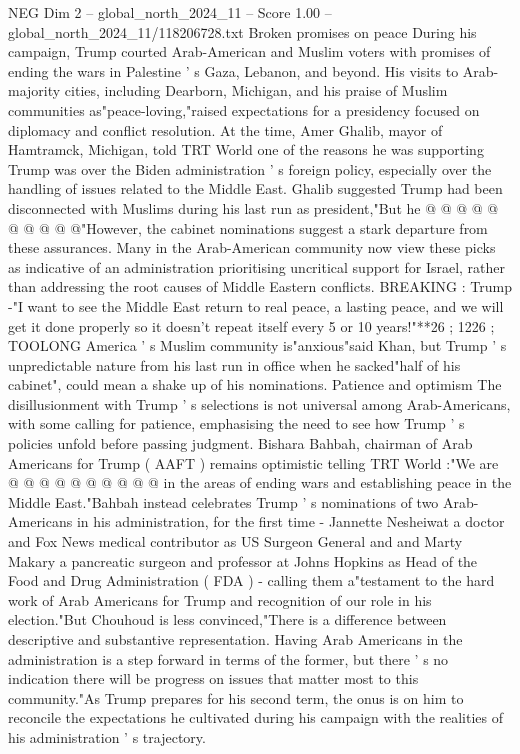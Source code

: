 \begin{textsample}{NEG Dim 2 – global\_north\_2024\_11 – Score 1.00 – global\_north\_2024\_11/118206728.txt}
Broken promises on peace During his campaign, Trump courted Arab-American and Muslim voters with promises of ending the wars in Palestine ' s Gaza, Lebanon, and beyond.
His visits to Arab-majority cities, including Dearborn, Michigan, and his praise of Muslim communities as"peace-loving,"raised expectations for a presidency focused on diplomacy and conflict resolution.
At the time, Amer Ghalib, mayor of Hamtramck, Michigan, told TRT World one of the reasons he was supporting Trump was over the Biden administration ' s foreign policy, especially over the handling of issues related to the Middle East.
Ghalib suggested Trump had been disconnected with Muslims during his last run as president,"But he @ @ @ @ @ @ @ @ @ @"However, the cabinet nominations suggest a stark departure from these assurances.
Many in the Arab-American community now view these picks as indicative of an administration prioritising uncritical support for Israel, rather than addressing the root causes of Middle Eastern conflicts.
BREAKING : Trump -"I want to see the Middle East return to real peace, a lasting peace, and we will get it done properly so it doesn't repeat itself every 5 or 10 years!"**26 ; 1226 ; TOOLONG America ' s Muslim community is"anxious"said Khan, but Trump ' s unpredictable nature from his last run in office when he sacked"half of his cabinet", could mean a shake up of his nominations.
Patience and optimism The disillusionment with Trump ' s selections is not universal among Arab-Americans, with some calling for patience, emphasising the need to see how Trump ' s policies unfold before passing judgment.
Bishara Bahbah, chairman of Arab Americans for Trump ( AAFT ) remains optimistic telling TRT World :"We are @ @ @ @ @ @ @ @ @ @ in the areas of ending wars and establishing peace in the Middle East."Bahbah instead celebrates Trump ' s nominations of two Arab-Americans in his administration, for the first time - Jannette Nesheiwat a doctor and Fox News medical contributor as US Surgeon General and and Marty Makary a pancreatic surgeon and professor at Johns Hopkins as Head of the Food and Drug Administration ( FDA ) - calling them a"testament to the hard work of Arab Americans for Trump and recognition of our role in his election."But Chouhoud is less convinced,"There is a difference between descriptive and substantive representation.
Having Arab Americans in the administration is a step forward in terms of the former, but there ' s no indication there will be progress on issues that matter most to this community."As Trump prepares for his second term, the onus is on him to reconcile the expectations he cultivated during his campaign with the realities of his administration ' s trajectory.

\end{textsample}
